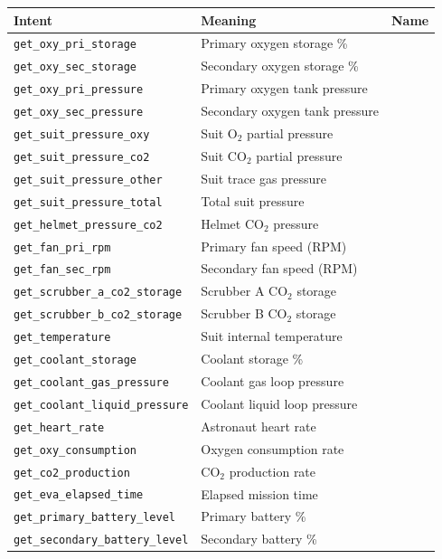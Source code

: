 \documentclass[11pt]{article}
\begin{document}
\begin{center}
\small
\begin{tabular}{@{}llc@{}}
\toprule
Intent & Meaning & Name \\
\midrule
\texttt{get\_oxy\_pri\_storage} & Primary oxygen storage \% & \\
\texttt{get\_oxy\_sec\_storage} & Secondary oxygen storage \% & \\
\texttt{get\_oxy\_pri\_pressure} & Primary oxygen tank pressure & \\
\texttt{get\_oxy\_sec\_pressure} & Secondary oxygen tank pressure & \\
\texttt{get\_suit\_pressure\_oxy} & Suit O$_2$ partial pressure & \\
\texttt{get\_suit\_pressure\_co2} & Suit CO$_2$ partial pressure & \\
\texttt{get\_suit\_pressure\_other} & Suit trace gas pressure & \\
\texttt{get\_suit\_pressure\_total} & Total suit pressure & \\
\texttt{get\_helmet\_pressure\_co2} & Helmet CO$_2$ pressure & \\
\texttt{get\_fan\_pri\_rpm} & Primary fan speed (RPM) & \\
\texttt{get\_fan\_sec\_rpm} & Secondary fan speed (RPM) & \\
\texttt{get\_scrubber\_a\_co2\_storage} & Scrubber A CO$_2$ storage & \\
\texttt{get\_scrubber\_b\_co2\_storage} & Scrubber B CO$_2$ storage & \\
\texttt{get\_temperature} & Suit internal temperature & \\
\texttt{get\_coolant\_storage} & Coolant storage \% & \\
\texttt{get\_coolant\_gas\_pressure} & Coolant gas loop pressure & \\
\texttt{get\_coolant\_liquid\_pressure} & Coolant liquid loop pressure & \\
\texttt{get\_heart\_rate} & Astronaut heart rate & \\
\texttt{get\_oxy\_consumption} & Oxygen consumption rate & \\
\texttt{get\_co2\_production} & CO$_2$ production rate & \\
\texttt{get\_eva\_elapsed\_time} & Elapsed mission time & \\
\texttt{get\_primary\_battery\_level} & Primary battery \% & \\
\texttt{get\_secondary\_battery\_level} & Secondary battery \% & \\

\end{tabular}
\end{center}
\end{document}
